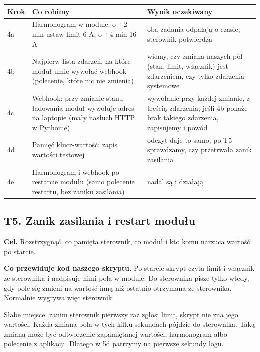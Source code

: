 \documentclass[11pt,a4paper]{article}
\begin{document}
\begin{longtable}{>{\raggedright\arraybackslash}p{3.00cm}>{\raggedright\arraybackslash}p{6.14cm}>{\raggedright\arraybackslash}p{6.14cm}}
\toprule
\rowcolor{apteallight}\textbf{Krok} & \textbf{Co robimy} & \textbf{Wynik oczekiwany} \\
\midrule\endhead
\bottomrule\endfoot
4a & Harmonogram w module: o +2 min ustaw limit 6 A, o +4 min 16 A & oba zadania odpalają o czasie, sterownik potwierdza \\
4b & Najpierw lista zdarzeń, na które moduł umie wywołać webhook (polecenie, które nic nie zmienia) & wiemy, czy zmiana naszych pól (stan, limit, włącznik) jest zdarzeniem, czy tylko zdarzenia systemowe \\
4c & Webhook: przy zmianie stanu ładowania moduł wywołuje adres na laptopie (mały nasłuch HTTP w Pythonie) & wywołanie przy każdej zmianie, z treścią zdarzenia; jeśli 4b pokaże brak takiego zdarzenia, zapisujemy \leavevmode{\symbolfont\color{apred}\textbf{✘}} i powód \\
4d & Pamięć klucz-wartość: zapis wartości testowej & odczyt daje to samo; po T5 sprawdzamy, czy przetrwała zanik zasilania \\
4e & Harmonogram i webhook po restarcie modułu (samo polecenie restartu, bez zaniku zasilania) & nadal są i działają \\
\end{longtable}

\subsection{T5. Zanik zasilania i restart modułu}

\textbf{Cel.} Rozstrzygnąć, co pamięta sterownik, co moduł i kto komu narzuca wartość po starcie.


\textbf{Co przewiduje kod naszego skryptu.} Po starcie skrypt czyta limit i włącznik ze sterownika i nadpisuje nimi pola w module. Do sterownika pisze tylko wtedy, gdy pole się zmieni na wartość inną niż ostatnio otrzymana ze sterownika. Normalnie wygrywa więc sterownik.


Słabe miejsce: zanim sterownik pierwszy raz zgłosi limit, skrypt nie zna jego wartości. Każda zmiana pola w tych kilku sekundach pójdzie do sterownika. Taką zmianą może być odtworzenie zapamiętanej wartości, harmonogram albo polecenie z aplikacji. Dlatego w 5d patrzymy na pierwsze sekundy logu.
\end{document}

